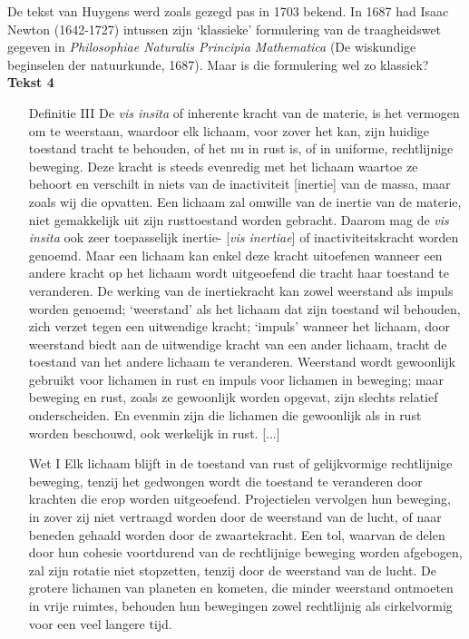 \documentclass{ximera}
\begin{document}
	
	De tekst van Huygens werd zoals gezegd pas in 1703 bekend. In 1687 had Isaac Newton (1642-1727) intussen zijn `klassieke' formulering van de traagheidswet gegeven in \textit{Philosophiae Naturalis Principia Mathematica} (De wiskundige beginselen der natuurkunde, 1687). Maar is die formulering wel zo klassiek?
	\textbf{Tekst 4}
	{\footnotesize
	\begin{enumerate}
	\item[Definitie III] De \textit{vis insita} of inherente kracht van de materie, is het vermogen om te weerstaan, waardoor elk lichaam, voor zover het kan, zijn huidige toestand tracht te behouden, of het nu in rust is, of in uniforme, rechtlijnige beweging.
	Deze kracht is steeds evenredig met het lichaam waartoe ze behoort en verschilt in niets van de
	inactiviteit [inertie] van de massa, maar zoals wij die opvatten. Een lichaam zal omwille van de
	inertie van de materie, niet gemakkelijk uit zijn rusttoestand worden gebracht. Daarom mag de \textit{vis
	insita} ook zeer toepasselijk inertie- [\textit{vis inertiae}] of inactiviteitskracht worden genoemd. Maar een lichaam kan enkel deze kracht uitoefenen wanneer een andere kracht op het lichaam wordt uitgeoefend die tracht haar toestand te veranderen. De werking van de inertiekracht kan zowel weerstand als impuls worden genoemd; `weerstand' als het lichaam dat zijn toestand wil behouden, zich verzet tegen een uitwendige kracht; `impuls' wanneer het lichaam, door weerstand biedt aan de uitwendige kracht van een ander lichaam, tracht de toestand van het andere lichaam te veranderen. Weerstand wordt gewoonlijk gebruikt voor lichamen in rust en impuls voor lichamen in beweging; maar beweging en rust, zoals ze gewoonlijk worden opgevat, zijn slechts relatief onderscheiden. En evenmin zijn die lichamen die gewoonlijk als in rust worden beschouwd, ook werkelijk in rust. [...]
	
	\item[Wet I] Elk lichaam blijft in de toestand van rust of gelijkvormige rechtlijnige beweging, tenzij het gedwongen wordt die toestand te veranderen door krachten die erop worden uitgeoefend.
	Projectielen vervolgen hun beweging, in zover zij niet vertraagd worden door de weerstand van de lucht, of naar beneden gehaald worden door de zwaartekracht. Een tol, waarvan de delen door hun cohesie voortdurend van de rechtlijnige beweging worden afgebogen, zal zijn rotatie niet stopzetten, tenzij door de weerstand van de lucht. De grotere lichamen van planeten en kometen, die minder weerstand ontmoeten in vrije ruimtes, behouden hun bewegingen zowel rechtlijnig als cirkelvormig voor een veel langere tijd.
	
	\end{enumerate}
	}
	
\end{document}
